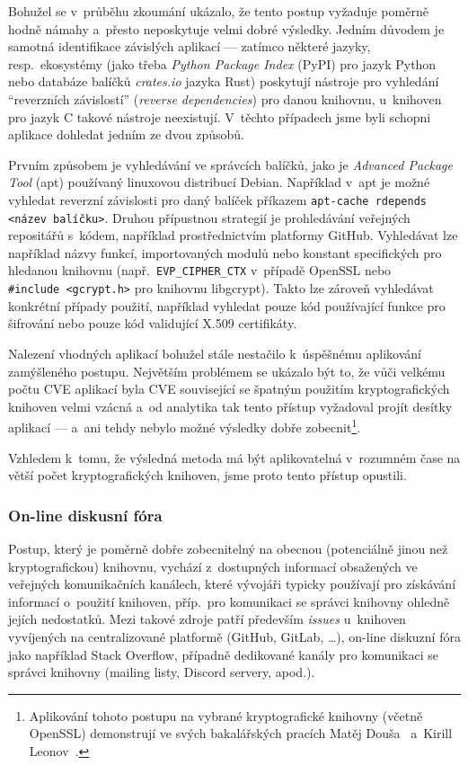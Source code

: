Bohužel se v~průběhu zkoumání ukázalo, že tento postup vyžaduje poměrně hodně námahy a~přesto neposkytuje velmi dobré výsledky. Jedním důvodem je samotná identifikace závislých aplikací --- zatímco některé jazyky, resp.\ ekosystémy (jako třeba \textit{Python Package Index} (PyPI) pro jazyk Python nebo databáze balíčků \textit{crates.io} jazyka Rust) poskytují nástroje pro vyhledání ``reverzních závislostí'' (\textit{reverse dependencies}) pro danou knihovnu, u~knihoven pro jazyk C takové nástroje neexistují. V~těchto případech jsme byli schopni aplikace dohledat jedním ze dvou způsobů.

Prvním způsobem je vyhledávání ve správcích balíčků, jako je \textit{Advanced Package Tool} (apt) používaný linuxovou distribucí Debian. Například v~apt je možné vyhledat reverzní závislosti pro daný balíček příkazem \texttt{apt-cache rdepends <název balíčku>}. Druhou přípustnou strategií je prohledávání veřejných repositářů s~kódem, například prostřednictvím platformy GitHub. Vyhledávat lze například názvy funkcí, importovaných modulů nebo konstant specifických pro hledanou knihovnu (např.\ \texttt{EVP\_CIPHER\_CTX} v~případě OpenSSL nebo \texttt{\#include~<gcrypt.h>} pro knihovnu libgcrypt). Takto lze zároveň vyhledávat konkrétní případy použití, například vyhledat pouze kód používající funkce pro šifrování nebo pouze kód validující X.509 certifikáty.

Nalezení vhodných aplikací bohužel stále nestačilo k~úspěšnému aplikování zamýšleného postupu. Největším problémem se ukázalo být to, že vůči velkému počtu CVE aplikací byla CVE související se špatným použitím kryptografických knihoven velmi vzácná a~od analytika tak tento přístup vyžadoval projít desítky aplikací --- a~ani tehdy nebylo možné výsledky dobře zobecnit\footnote{Aplikování tohoto postupu na vybrané kryptografické knihovny (včetně OpenSSL) demonstrují ve svých bakalářských pracích Matěj Douša~\cite{matej} a~Kirill Leonov~\cite{kirill}.}.

Vzhledem k~tomu, že výsledná metoda má být aplikovatelná v~rozumném čase na větší počet kryptografických knihoven, jsme proto tento přístup opustili.

\subsubsection*{On-line diskusní fóra}

Postup, který je poměrně dobře zobecnitelný na obecnou (potenciálně jinou než kryptografickou) knihov\-nu, vychází z~dostupných informací obsažených ve veřejných komunikačních kanálech, které vývojáři typicky používají pro získávání informací o~použití knihoven, příp.\ pro komunikaci se správci knihovny ohledně jejích nedostatků. Mezi takové zdroje patří především \textit{issues} u~knihoven vy\-ví\-je\-ných na centralizované platformě (GitHub, GitLab, \dots), on-line diskuzní fóra jako například Stack Overflow, případně dedikované kanály pro komunikaci se správci knihovny (mailing listy, Discord servery, apod.).

